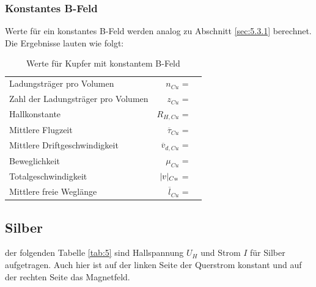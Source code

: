 \subsubsection{Konstantes B-Feld} \label{sec:5.3.2}

\justifying Werte für ein konstantes B-Feld werden analog zu Abschnitt \ref{sec:5.3.1} berechnet. 
Die Ergebnisse lauten wie folgt:

\begin{table}[H]
\centering
    \begin{tabular}{l r l}
    \toprule
        Ladungsträger pro Volumen               &$n_{Cu}$               = & \text{}  \\
        Zahl der Ladungsträger pro Volumen      &$z_{Cu}$               = & \text{}  \\
        Hallkonstante                           &$R_{H,Cu}$             = & \text{} \\
        Mittlere Flugzeit                       &$\overline{\tau}_{Cu}$ = & \text{}\\
        Mittlere Driftgeschwindigkeit           &$\overline{v}_{d,Cu}$  = & \text{}\\
        Beweglichkeit                           &$\mu_{Cu}$             = & \text{} \\
        Totalgeschwindigkeit                    &$\lvert v\rvert_{Cu}$         = & \text{}  \\
        Mittlere freie Weglänge                 &$\overline{l}_{Cu}$    = & \text{}  \\
        \bottomrule
    \end{tabular}
\caption{Werte für Kupfer mit konstantem B-Feld}
\label{tab:4}
\end{table}

\subsection{Silber} \label{sec:5.4}

\justifying der folgenden Tabelle \ref{tab:5} sind Hallspannung $U_H$ und Strom $I$ für Silber aufgetragen. Auch hier ist auf der
linken Seite der Querstrom konstant und auf der rechten Seite das Magnetfeld. 
 
